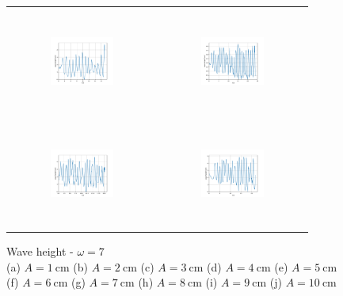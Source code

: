 \begin{figure}[H]
\begin{center}
\begin{tabular}{cc}
\includegraphics[width=0.45\textwidth, height=3.5cm]{graph/omega=2.00_A=7_wave.pdf}
&
\includegraphics[width=0.45\textwidth, height=3.5cm]{graph/omega=2.00_A=8_wave.pdf}\\
\includegraphics[width=0.45\textwidth, height=3.5cm]{graph/omega=2.00_A=9_wave.pdf}
&
\includegraphics[width=0.45\textwidth, height=3.5cm]{graph/omega=2.00_A=10_wave.pdf}\\
\end{tabular}
\end{center}
\caption{Wave height - $\omega=7$ \\ (a) $A=1\mathrm{~cm}$ (b) $A=2\mathrm{~cm}$ (c) $A=3\mathrm{~cm}$ (d) $A=4\mathrm{~cm}$ (e) $A=5\mathrm{~cm}$\\(f) $A=6\mathrm{~cm}$ (g) $A=7\mathrm{~cm}$ (h) $A=8\mathrm{~cm}$ (i) $A=9\mathrm{~cm}$ (j) $A=10\mathrm{~cm}$}
\label{Data_omega=7_wave}
\end{figure}

